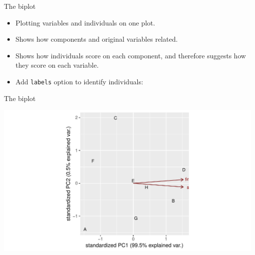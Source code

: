 \begin{frame}[fragile]{The biplot}
  
  \begin{itemize}
  \item Plotting variables and individuals on one plot.
  \item Shows how components and original variables related.
  \item Shows how individuals score on each component, and therefore
    suggests how they score on each variable.
  \item Add \texttt{labels} option to identify individuals:
    
\begin{knitrout}
\color{fgcolor}\begin{kframe}
\begin{alltt}
\hlkwb{=}\hlopt{$}
\end{alltt}
\end{kframe}
\end{knitrout}
    
  \end{itemize}
  
\end{frame}

\begin{frame}[fragile]{The biplot}
  
\begin{knitrout}
\color{fgcolor}
\includegraphics[width=\maxwidth]{figure/ff3-1} 

\end{knitrout}
  
  
  
\end{frame}

